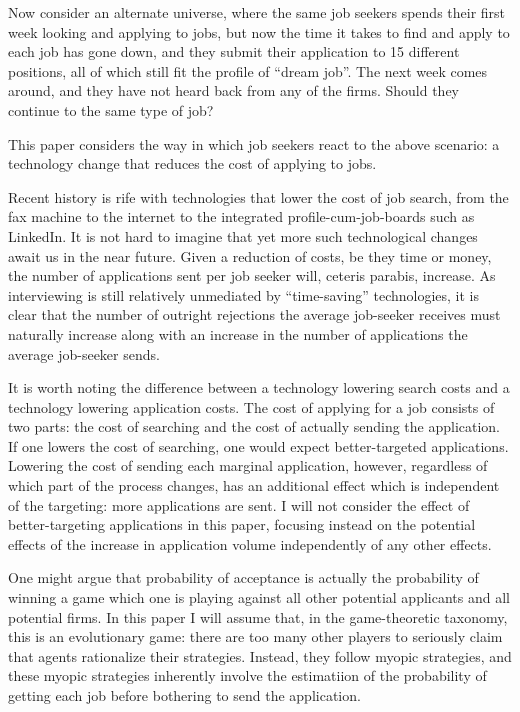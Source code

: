 \documentclass[a4paper,12pt]{article}
\begin{document}
Now consider an alternate universe, where the same job seekers spends their first week looking and applying to jobs, but now the time it takes to find and apply to each job has gone down, and they submit their application to 15 different positions, all of which still fit the profile of ``dream job''. The next week comes around, and they have not heard back from any of the firms. Should they continue to the same type of job?

This paper considers the way in which job seekers react to the above scenario: a technology change that reduces the cost of applying to jobs.

Recent history is rife with technologies that lower the cost of job search, from the fax machine to the internet to the integrated profile-cum-job-boards such as LinkedIn. It is not hard to imagine that yet more such technological changes await us in the near future. Given a reduction of costs, be they time or money, the number of applications sent per job seeker will, ceteris parabis, increase. As interviewing is still relatively unmediated by ``time-saving'' technologies, it is clear that the number of outright rejections the average job-seeker receives must naturally increase along with an increase in the number of applications the average job-seeker sends.

It is worth noting the difference between a technology lowering search costs and a technology lowering application costs. The cost of applying for a job consists of two parts: the cost of searching and the cost of actually sending the application. If one lowers the cost of searching, one would expect better-targeted applications. Lowering the cost of sending each marginal application, however, regardless of which part of the process changes, has an additional effect which is independent of the targeting: more applications are sent. I will not consider the effect of better-targeting applications in this paper, focusing instead on the potential effects of the increase in application volume independently of any other effects.

One might argue that probability of acceptance is actually the probability of winning a game which one is playing against all other potential applicants and all potential firms. In this paper I will assume that, in the game-theoretic taxonomy, this is an evolutionary game: there are too many other players to seriously claim that agents rationalize their strategies. Instead, they follow myopic strategies, and these myopic strategies inherently involve the estimatiion of the probability of getting each job before bothering to send the application.
\end{document}
